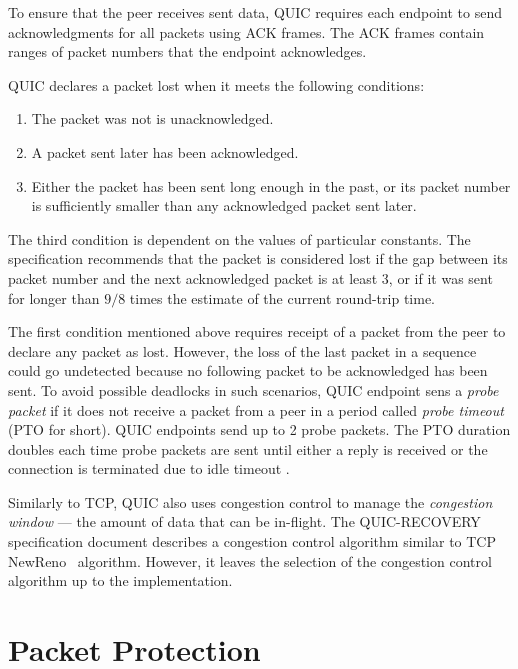 To ensure that the peer receives sent data, QUIC requires each endpoint to send acknowledgments for
all packets using ACK frames. The ACK frames contain ranges of packet numbers that the endpoint
acknowledges.

QUIC declares a packet lost when it meets the following conditions:

\begin{enumerate}

  \item The packet was not is unacknowledged.

  \item A packet sent later has been acknowledged.

  \item Either the packet has been sent long enough in the past, or its packet number is
sufficiently smaller than any acknowledged packet sent later.

\end{enumerate}

The third condition is dependent on the values of particular constants. The specification recommends
that the packet is considered lost if the gap between its packet number and the next acknowledged
packet is at least 3, or if it was sent for longer than $9/8$ times the estimate of the current
round-trip time.

The first condition mentioned above requires receipt of a packet from the peer to declare any packet
as lost. However, the loss of the last packet in a sequence could go undetected because no following
packet to be acknowledged has been sent. To avoid possible deadlocks in such scenarios, QUIC
endpoint sens a \textit{probe packet} if it does not receive a packet from a peer in a period called
\textit{probe timeout} (PTO for short). QUIC endpoints send up to 2 probe packets. The PTO duration
doubles each time probe packets are sent until either a reply is received or the connection is
terminated due to idle timeout .

Similarly to TCP, QUIC also uses congestion control to manage the \textit{congestion window} --- the
amount of data that can be in-flight. The QUIC-RECOVERY specification document describes a
congestion control algorithm similar to TCP NewReno~\cite{rfc6582} algorithm. However, it leaves the
selection of the congestion control algorithm up to the implementation.

\section{Packet Protection}

